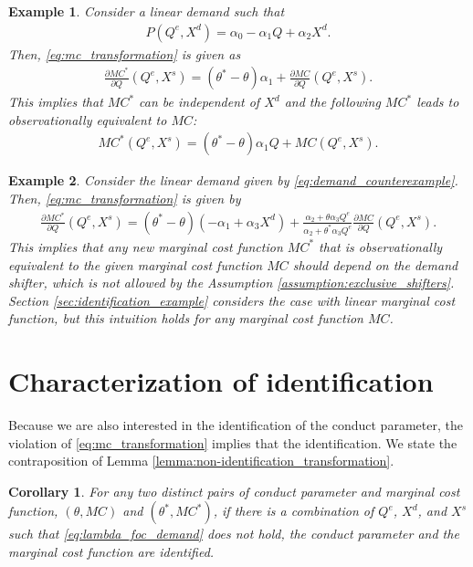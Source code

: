\documentclass[11pt, a4paper]{article}
\newtheorem{corollary}{Corollary}
\newtheorem{example}{Example}
\theoremstyle{remark}
\begin{document}
\begin{example}\label{example:bresnahan_1982}
    Consider a linear demand such that
    \begin{align}
        P(Q^e, X^{d}) = \alpha_0 - \alpha_1Q + \alpha_2X^{d}.
    \end{align}
    Then, \eqref{eq:mc_transformation} is given as
    \begin{align}
        \frac{\partial MC^{*}}{\partial Q}(Q^e, X^{s}) = (\theta^{*} - \theta)\alpha_1 + \frac{\partial MC}{\partial Q}(Q^e, X^{s}).
    \end{align}
    This implies that $MC^{*}$ can be independent of $X^{d}$ and the following $MC^{*}$ leads to observationally equivalent to $MC$:
    \begin{align}
        MC^{*}(Q^e, X^{s}) = (\theta^{*} - \theta)\alpha_1Q + MC(Q^e, X^{s}).
    \end{align}
\end{example}

\begin{example}\label{example:demand_counterexample}
    Consider the linear demand given by \eqref{eq:demand_counterexample}.
    Then, \eqref{eq:mc_transformation} is given by
    \begin{align}
        \frac{\partial MC^{*}}{\partial Q}(Q^e, X^{s}) = (\theta^{*} - \theta)(-\alpha_1 + \alpha_3X^{d}) +  \frac{\alpha_2 + \theta\alpha_3Q^e}{\alpha_2 + \theta^{*}\alpha_3Q^e}\frac{\partial MC}{\partial Q}(Q^e, X^{s}).
    \end{align}
    This implies that any new marginal cost function $MC^{*}$ that is observationally equivalent to the given marginal cost function $MC$ should depend on the demand shifter, which is not allowed by the Assumption \ref{assumption:exclusive_shifters}.
    Section \ref{sec:identification_example} considers the case with linear marginal cost function, but this intuition holds for any marginal cost function $MC$.
\end{example}



\section{Characterization of identification}\label{sec:identification_characterization}


Because we are also interested in the identification of the conduct parameter, the violation of \eqref{eq:mc_transformation} implies that the identification.
We state the contraposition of Lemma \ref{lemma:non-identification_transformation}.
\begin{corollary}
    For any two distinct pairs of conduct parameter and marginal cost function, $(\theta, MC)$ and $(\theta^{*}, MC^{*})$, if there is a combination of $Q^e$, $X^{d}$, and $X^{s}$ such that \eqref{eq:lambda_foc_demand} does not hold, the conduct parameter and the marginal cost function are identified.
\end{corollary}
\end{document}
